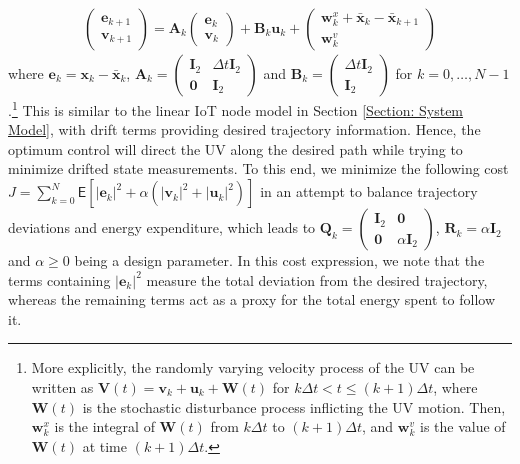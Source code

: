 \documentclass[10pt, journal, letterpaper]{IEEEtran}
\newcommand{\paren}[1]{\left(#1\right)}
\newcommand{\abs}[1]{\left| #1\right|}
\newcommand{\1}{\ensuremath{\mathbf{1}}} %
\newcommand{\ES}[1]{\ensuremath{\mathsf{E}\left[#1 \right]}} %
\newcommand{\vecbold}[1]{\ensuremath{\boldsymbol{#1}}}
\begin{document}
\begin{eqnarray}
\left(\begin{array}{c} \vecbold{e}_{k+1} \\ \vecbold{v}_{k+1} \end{array}\right) = \vecbold{A}_k \left(\begin{array}{c} \vecbold{e}_{k} \\ \vecbold{v}_{k} \end{array}\right) + \vecbold{B}_k \vecbold{u}_k + \left(\begin{array}{c}\vecbold{w}_{k}^x + \bar{\vecbold{x}}_{k} - \bar{\vecbold{x}}_{k+1} \\ \vecbold{w}_k^v\end{array}\right) \nonumber
\end{eqnarray}
where $\vecbold{e}_{k} = \vecbold{x}_{k} - \bar{\vecbold{x}}_{k}$, $\vecbold{A}_k = \left(\begin{array}{cc}\vecbold{I}_{2} & \Delta t \vecbold{I}_2 \\ \vecbold{0} & \vecbold{I}_2\end{array}\right)$ and $\vecbold{B}_k = \left(\begin{array}{c}\Delta t \vecbold{I}_{2} \\ \vecbold{I}_{2} \end{array}\right)$ for $k=0, \ldots, N-1$.\footnote{More explicitly, the randomly varying velocity process of the UV can be written as $\vecbold{V}(t) = \vecbold{v}_k + \vecbold{u}_k + \vecbold{W}(t)$ for $k \Delta t < t \leq (k+1)\Delta t $, where $\vecbold{W}(t)$ is the stochastic disturbance process inflicting the UV motion.  Then, $\vecbold{w}_{k}^x$ is the integral of $\vecbold{W}(t)$ from $k\Delta t$ to $(k+1)\Delta t$, and $\vecbold{w}_k^v$ is the value of $\vecbold{W}(t)$ at time $(k+1)\Delta t$.} This is similar to the linear IoT node model in Section \ref{Section: System Model}, with drift terms providing desired trajectory information. Hence, the optimum control will direct the UV along the desired path while trying to minimize drifted state measurements. To this end, we minimize the following cost $J = \sum_{k=0}^N \ES{\abs{\vecbold{e}_k}^2 + \alpha\paren {\abs{\vecbold{v}_k}^2 + \abs{\vecbold{u}_k}^2}}$ in an attempt to balance trajectory deviations and energy expenditure, which leads to $\vecbold{Q}_k = \left(\begin{array}{cc}\vecbold{I}_{2} & \vecbold{0} \\ \vecbold{0} & \alpha \vecbold{I}_2\end{array}\right)$, $\vecbold{R}_k = \alpha \vecbold{I}_2$ and $\alpha \geq 0$ being a design parameter. %
In this cost expression, we note that the terms containing $\abs{\vecbold{e}_k}^2$ measure the total deviation from the desired trajectory, whereas the remaining terms act as a proxy for the total energy spent to follow it.
\end{document}
